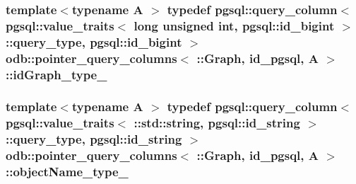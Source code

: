 \subsubsection[{id\+Graph\+\_\+type\+\_\+}]{\setlength{\rightskip}{0pt plus 5cm}template$<$typename A $>$ typedef pgsql\+::query\+\_\+column$<$ pgsql\+::value\+\_\+traits$<$ long unsigned int, pgsql\+::id\+\_\+bigint $>$\+::query\+\_\+type, pgsql\+::id\+\_\+bigint $>$ odb\+::pointer\+\_\+query\+\_\+columns$<$ \+::{\bf Graph}, id\+\_\+pgsql, A $>$\+::{\bf id\+Graph\+\_\+type\+\_\+}}\label{structodb_1_1pointer__query__columns_3_01_1_1_graph_00_01id__pgsql_00_01_a_01_4_a952f08becd331e59532291cfb4dcd7b5}
\hypertarget{structodb_1_1pointer__query__columns_3_01_1_1_graph_00_01id__pgsql_00_01_a_01_4_a7f15e44218d9dca730884cbfe432ae38}{}
\subsubsection[{object\+Name\+\_\+type\+\_\+}]{\setlength{\rightskip}{0pt plus 5cm}template$<$typename A $>$ typedef pgsql\+::query\+\_\+column$<$ pgsql\+::value\+\_\+traits$<$ \+::std\+::string, pgsql\+::id\+\_\+string $>$\+::query\+\_\+type, pgsql\+::id\+\_\+string $>$ odb\+::pointer\+\_\+query\+\_\+columns$<$ \+::{\bf Graph}, id\+\_\+pgsql, A $>$\+::{\bf object\+Name\+\_\+type\+\_\+}}\label{structodb_1_1pointer__query__columns_3_01_1_1_graph_00_01id__pgsql_00_01_a_01_4_a7f15e44218d9dca730884cbfe432ae38}
\hypertarget{structodb_1_1pointer__query__columns_3_01_1_1_graph_00_01id__pgsql_00_01_a_01_4_a8a225606c1afca01500d85c3ce13373e}{}
